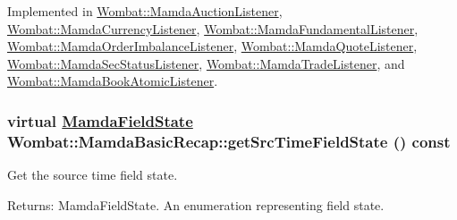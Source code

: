 Implemented in \hyperlink{classWombat_1_1MamdaAuctionListener_4632a4659cd012dee4d8059ee7fab6c7}{Wombat::Mamda\-Auction\-Listener}, \hyperlink{classWombat_1_1MamdaCurrencyListener_04fcdfcdc9376b9a0daf71773e28b58e}{Wombat::Mamda\-Currency\-Listener}, \hyperlink{classWombat_1_1MamdaFundamentalListener_f28f624d9a523c9d0db2717f2b3b69e9}{Wombat::Mamda\-Fundamental\-Listener}, \hyperlink{classWombat_1_1MamdaOrderImbalanceListener_62085e018b55aee3a14325d692dea2c5}{Wombat::Mamda\-Order\-Imbalance\-Listener}, \hyperlink{classWombat_1_1MamdaQuoteListener_3632c2277d9c0a6bf0882f484966f71c}{Wombat::Mamda\-Quote\-Listener}, \hyperlink{classWombat_1_1MamdaSecStatusListener_75adf29cbb39a3060b593f6bb43a7d42}{Wombat::Mamda\-Sec\-Status\-Listener}, \hyperlink{classWombat_1_1MamdaTradeListener_913b0f0e63ffde58f3f01a11d551bc9c}{Wombat::Mamda\-Trade\-Listener}, and \hyperlink{classWombat_1_1MamdaBookAtomicListener_a43104e4c912b926990c05ff0f35ef02}{Wombat::Mamda\-Book\-Atomic\-Listener}.\hypertarget{classWombat_1_1MamdaBasicRecap_ee5ca73a67ccc8d81b78cf02fa36ec37}{
\subsubsection[getSrcTimeFieldState]{\setlength{\rightskip}{0pt plus 5cm}virtual \hyperlink{namespaceWombat_93aac974f2ab713554fd12a1fa3b7d2a}{Mamda\-Field\-State} Wombat::Mamda\-Basic\-Recap::get\-Src\-Time\-Field\-State () const}}
\label{classWombat_1_1MamdaBasicRecap_ee5ca73a67ccc8d81b78cf02fa36ec37}


Get the source time field state. 

\begin{Desc}
\item[Returns:]Mamda\-Field\-State. An enumeration representing field state. \end{Desc}


